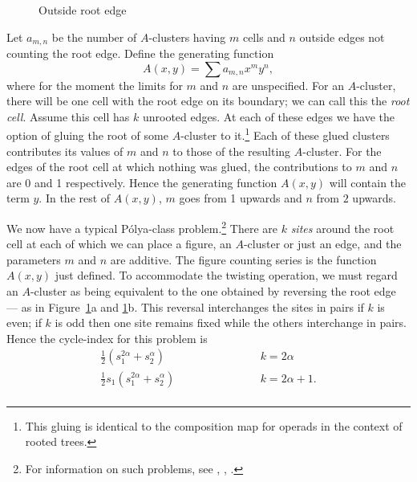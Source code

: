 \documentclass[10pt]{amsart}
\begin{document}
\begin{figure}[h]
\caption{Outside root edge}
\label{rootedge}
\end{figure}

Let $a_{m,n}$ be the number of $A$-clusters having $m$ cells and $n$ outside edges not counting the root edge.   Define the generating function
\begin{equation}
A(x, y)  =  \sum a_{m,n}x^m y^n,
\label{e:gena}
\end{equation}
where for the moment the limits for $m$ and $n$ are unspecified. For an $A$-cluster, there will be one cell with the root edge on its boundary;  we can call this the {\em root cell}.  Assume this cell has $k$ unrooted edges.  At each of these edges we have the option of gluing the root of some $A$-cluster to it.\footnote{This gluing is identical to the composition map for operads in the context of rooted trees.} Each of these glued clusters contributes its values of $m$ and $n$ to those of the resulting $A$-cluster.  For the edges of the root cell at which nothing was glued, the contributions to $m$ and $n$ are 0 and 1 respectively. Hence the generating function $A(x,y)$ will contain the term $y$.  In the rest of $A(x,y)$, $m$ goes from 1 upwards and $n$ from $2$ upwards.

We now have a typical P\'{o}lya-class problem.\footnote{For information on such problems, see \cite{pol}, \cite{pr}, \cite{r3}.} There are $k$ {\em sites} around the root cell at each of which we can place a figure, an $A$-cluster or just an edge, and the parameters $m$ and $n$ are additive.  The figure counting series is the function $A(x,y)$ just defined.   To accommodate the twisting operation, we must regard an $A$-cluster as being equivalent to the one obtained by reversing the root edge --- as in Figure~\ref{rootedge}a and \ref{rootedge}b. This reversal interchanges the sites in pairs if $k$ is even;  if $k$ is odd then one site remains fixed while the others interchange in pairs.   Hence the cycle-index for this problem is
\begin{eqnarray*}
\frac{1}{2}(s_1^{2\alpha} + s_2^\alpha) & \hspace{1in} & k = 2\alpha \\
\frac{1}{2}s_1(s_1^{2\alpha} + s_2^\alpha) & \hspace{1in} & k = 2\alpha + 1. \\
\end{eqnarray*}
\end{document}
